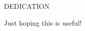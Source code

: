 \newpage
{}

\begin{center}
DEDICATION
\end{center}

\begin{center}
Just hoping this is useful!
\end{center}
